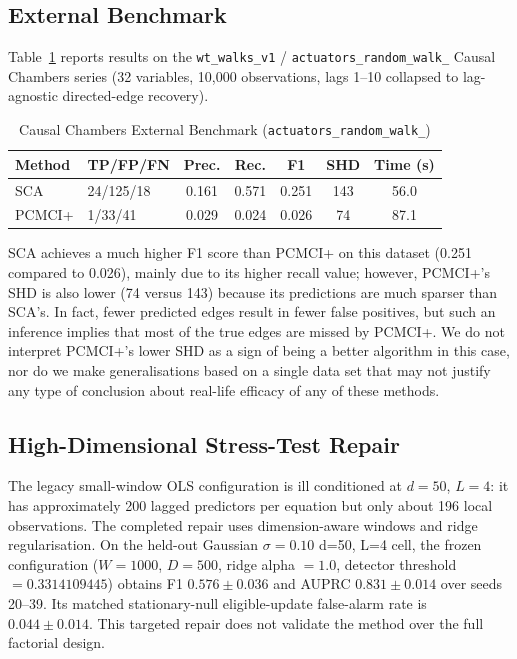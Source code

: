 \documentclass{ieeeaccess}
\begin{document}
\subsection{External Benchmark}
\label{res:chambers}
Table~\ref{tab:chambers} reports results on the \texttt{wt\_\allowbreak walks\_\allowbreak v1} / \texttt{actuators\_\allowbreak random\_\allowbreak walk\_} Causal Chambers series (32 variables, 10,000 observations, lags 1--10 collapsed to lag-agnostic directed-edge recovery).

\begin{table}[!t]
\caption{Causal Chambers External Benchmark (\texttt{actuators\_\allowbreak random\_\allowbreak walk\_})}
\label{tab:chambers}
\centering
\footnotesize
\setlength{\tabcolsep}{3pt}
\begin{tabular}{llccccc}
\toprule
\textbf{Method} & \textbf{TP/FP/FN} & \textbf{Prec.} & \textbf{Rec.} & \textbf{F1} & \textbf{SHD} & \textbf{Time (s)}\\
\midrule
SCA    & 24/125/18 & 0.161 & 0.571 & 0.251 & 143 & 56.0\\
PCMCI+ & 1/33/41   & 0.029 & 0.024 & 0.026 & 74  & 87.1\\
\bottomrule
\end{tabular}
\end{table}

SCA achieves a much higher F1 score than PCMCI+ on this dataset (0.251 compared to 0.026), mainly due to its higher recall value; however, PCMCI+'s SHD is also lower (74 versus 143) because its predictions are much sparser than SCA's. In fact, fewer predicted edges result in fewer false positives, but such an inference implies that most of the true edges are missed by PCMCI+. We do not interpret PCMCI+'s lower SHD as a sign of being a better algorithm in this case, nor do we make generalisations based on a single data set that may not justify any type of conclusion about real-life efficacy of any of these methods.

\subsection{High-Dimensional Stress-Test Repair}
\label{res:failure}
The legacy small-window OLS configuration is ill conditioned at $d=50$, $L=4$: it has approximately 200 lagged predictors per equation but only about 196 local observations. The completed repair uses dimension-aware windows and ridge regularisation. On the held-out Gaussian $\sigma=0.10$ d=50, L=4 cell, the frozen configuration ($W=1000$, $D=500$, ridge alpha $=1.0$, detector threshold $=0.3314109445$) obtains F1 $0.576\pm0.036$ and AUPRC $0.831\pm0.014$ over seeds 20--39. Its matched stationary-null eligible-update false-alarm rate is $0.044\pm0.014$. This targeted repair does not validate the method over the full factorial design.
\end{document}
